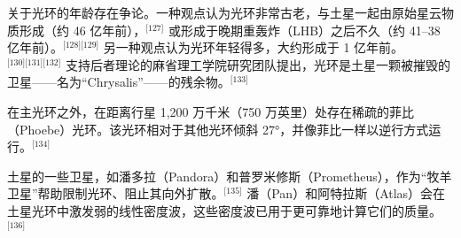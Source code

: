 关于光环的年龄存在争论。一种观点认为光环非常古老，与土星一起由原始星云物质形成（约 46 亿年前），\(^\text{[127]}\) 或形成于晚期重轰炸（LHB）之后不久（约 41–38 亿年前）。\(^\text{[128][129]}\) 另一种观点认为光环年轻得多，大约形成于 1 亿年前。\(^\text{[130][131][132]}\) 支持后者理论的麻省理工学院研究团队提出，光环是土星一颗被摧毁的卫星——名为“Chrysalis”——的残余物。\(^\text{[133]}\)

在主光环之外，在距离行星 1,200 万千米（750 万英里）处存在稀疏的菲比（Phoebe）光环。该光环相对于其他光环倾斜 27°，并像菲比一样以逆行方式运行。\(^\text{[134]}\)

土星的一些卫星，如潘多拉（Pandora）和普罗米修斯（Prometheus），作为“牧羊卫星”帮助限制光环、阻止其向外扩散。\(^\text{[135]}\) 潘（Pan）和阿特拉斯（Atlas）会在土星光环中激发弱的线性密度波，这些密度波已用于更可靠地计算它们的质量。\(^\text{[136]}\)
